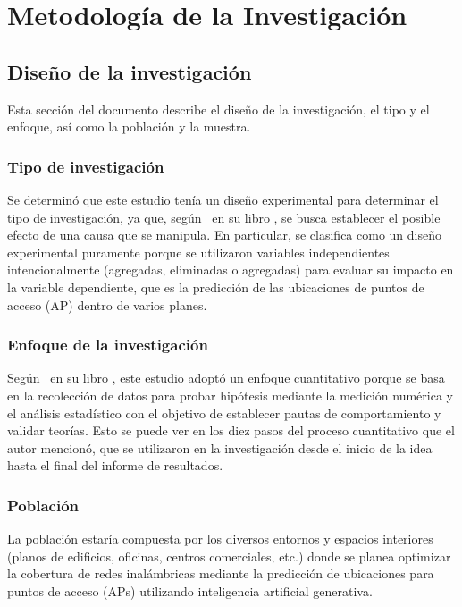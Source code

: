 \chapter{Metodología de la Investigación}
\section{Diseño de la investigación}
Esta sección del documento describe el diseño de la investigación, el tipo y el enfoque, así como la población y la muestra.

\subsection{Tipo de investigación}
Se determinó que este estudio tenía un diseño experimental para determinar el tipo de investigación, ya que, según \cite{bk_hernandez2014metodologia} en su libro , se busca establecer el posible efecto de una causa que se manipula. En particular, se clasifica como un diseño experimental puramente porque se utilizaron variables independientes intencionalmente (agregadas, eliminadas o agregadas) para evaluar su impacto en la variable dependiente, que es la predicción de las ubicaciones de puntos de acceso (AP) dentro de varios planes.

\subsection{Enfoque de la investigación}
Según \cite{bk_hernandez2014metodologia} en su libro , este estudio adoptó un enfoque cuantitativo porque se basa en la recolección de datos para probar hipótesis mediante la medición numérica y el análisis estadístico con el objetivo de establecer pautas de comportamiento y validar teorías. Esto se puede ver en los diez pasos del proceso cuantitativo que el autor mencionó, que se utilizaron en la investigación desde el inicio de la idea hasta el final del informe de resultados.

\subsection{Población}
La población estaría compuesta por los diversos entornos y espacios interiores (planos de edificios, oficinas, centros comerciales, etc.) donde se planea optimizar la cobertura de redes inalámbricas mediante la predicción de ubicaciones para puntos de acceso (APs) utilizando inteligencia artificial generativa.

